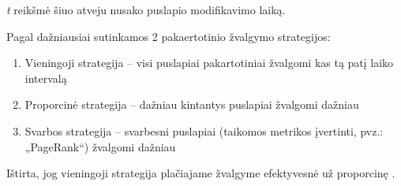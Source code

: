 \textit{t} reikšmė šiuo atveju nusako puslapio modifikavimo laiką.


Pagal \cite{EffectiveWebCrawling} dažniausiai sutinkamos 2 pakaertotinio žvalgymo strategijos:

\begin{enumerate}
    \item Vieningoji strategija -- visi puslapiai pakartotiniai žvalgomi kas tą patį laiko intervalą
    \item Proporcinė strategija -- dažniau kintantys puslapiai žvalgomi dažniau
    \item Svarbos strategija -- svarbesni puslapiai (taikomos metrikos įvertinti, pvz.: „PageRank“) žvalgomi dažniau
\end{enumerate}

Ištirta, jog vieningoji strategija plačiajame žvalgyme efektyvesnė už proporcinę \cite{EffectiveWebCrawling}.
